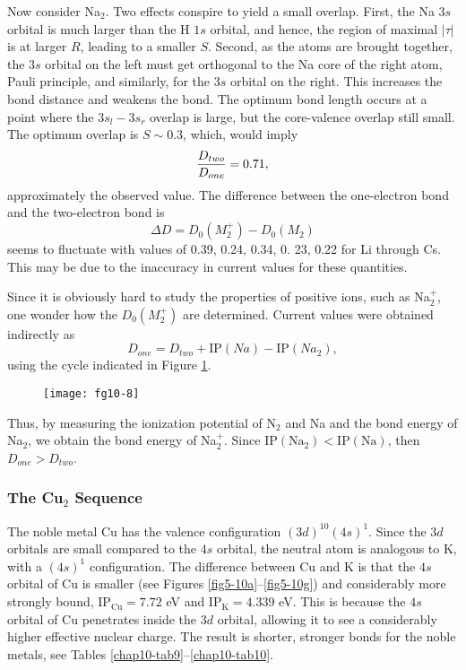 Now consider Na$_2$. Two effects conspire to yield a small overlap. 
First, the Na $3s$ orbital is much larger than the H $1s$ orbital, and 
hence, the region of maximal $| \tau |$ is at larger $R$, leading to a 
smaller $S$.  Second, as the atoms are brought together, the $3s$ 
orbital on the left must get orthogonal to the Na core of the 
right atom, Pauli principle, and similarly, for the $3s$ orbital
on the right.  This increases the bond distance and weakens the bond. The 
optimum bond length occurs at a point where the $3s_l - 3s_r$ 
overlap is large, but the core-valence overlap still small.  The 
optimum overlap is $S \sim 0. 3$, which, would imply
\begin{equation}
{D_{two} \over D_{one}} = 0. 71 , 
\end{equation}
approximately the observed value.  The difference between the one-electron 
bond and the two-electron bond is
\begin{equation}
\Delta D = D_0 \left( M^+_2 \right) - D_0 (M_2)
\end{equation}
seems to fluctuate with values of
0.39, 0.24, 0.34, 0. 23, 0.22 for Li through Cs.
This may be due to the inaccuracy in current values for these quantities.

Since it is obviously hard to study the properties of positive ions, such
as Na$^+_2$, one wonder how the $D_0(M^+_2)$ are determined.  Current values 
were obtained indirectly as
\begin{equation}
D_{one} = D_{two} + \mathrm{IP}(Na) - \mathrm{IP}(Na_2),
\end{equation}
using the cycle indicated in Figure \ref{chap10-fig8}.

\begin{figure}
\texttt{[image: fg10-8]}
\caption{}
\label{chap10-fig8}
\end{figure}

Thus, by measuring the ionization potential of N$_2$ and
Na and the bond energy of Na$_2$, we obtain the bond energy of 
Na$^+_2$.  Since $\mathrm{IP}(\mathrm{Na}_2) < \mathrm{IP}(\mathrm{Na})$, 
then $D_{one} > D_{two}$.

\subsubsection{The Cu$_2$ Sequence}

The noble metal Cu has the valence configuration $(3d)^{10} (4s)^1$.
Since the $3d$ orbitals are small compared to the $4s$ orbital, the
neutral atom is analogous to K, with a $(4s)^1$ configuration. The
difference between Cu and K is that the $4s$ orbital of Cu is smaller
(see Figures \ref{fig5-10a}--\ref{fig5-10g}) and considerably more
strongly bound, $\mathrm{IP}_{\mathrm{Cu}} = 7.72$ eV and
$\mathrm{IP}_\mathrm{K} = 4.339$ eV.  This is because the $4s$ orbital
of Cu penetrates inside the $3d$ orbital, allowing it to see a
considerably higher effective nuclear charge.  The result is shorter,
stronger bonds for the noble metals, see Tables
\ref{chap10-tab9}--\ref{chap10-tab10}.

